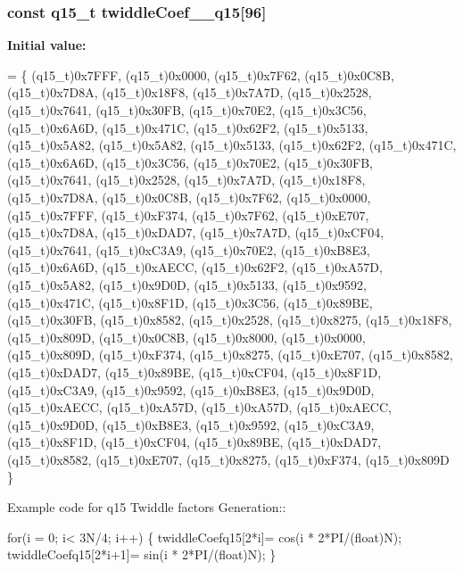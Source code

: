 \subsubsection[{\texorpdfstring{twiddle\+Coef\+\_\+64\+\_\+q15}{twiddleCoef_64_q15}}]{\setlength{\rightskip}{0pt plus 5cm}const q15\+\_\+t twiddle\+Coef\+\_\+\_\+q15\mbox{[}96\mbox{]}}\hypertarget{group__CFFT__CIFFT_gaa0cc411e0b3c82078e85cfdf1b84290f}{}\label{group__CFFT__CIFFT_gaa0cc411e0b3c82078e85cfdf1b84290f}
{\bfseries Initial value\+:}
\begin{DoxyCode}
= \{
    (q15\_t)0x7FFF, (q15\_t)0x0000, (q15\_t)0x7F62, (q15\_t)0x0C8B,
    (q15\_t)0x7D8A, (q15\_t)0x18F8, (q15\_t)0x7A7D, (q15\_t)0x2528,
    (q15\_t)0x7641, (q15\_t)0x30FB, (q15\_t)0x70E2, (q15\_t)0x3C56,
    (q15\_t)0x6A6D, (q15\_t)0x471C, (q15\_t)0x62F2, (q15\_t)0x5133,
    (q15\_t)0x5A82, (q15\_t)0x5A82, (q15\_t)0x5133, (q15\_t)0x62F2,
    (q15\_t)0x471C, (q15\_t)0x6A6D, (q15\_t)0x3C56, (q15\_t)0x70E2,
    (q15\_t)0x30FB, (q15\_t)0x7641, (q15\_t)0x2528, (q15\_t)0x7A7D,
    (q15\_t)0x18F8, (q15\_t)0x7D8A, (q15\_t)0x0C8B, (q15\_t)0x7F62,
    (q15\_t)0x0000, (q15\_t)0x7FFF, (q15\_t)0xF374, (q15\_t)0x7F62,
    (q15\_t)0xE707, (q15\_t)0x7D8A, (q15\_t)0xDAD7, (q15\_t)0x7A7D,
    (q15\_t)0xCF04, (q15\_t)0x7641, (q15\_t)0xC3A9, (q15\_t)0x70E2,
    (q15\_t)0xB8E3, (q15\_t)0x6A6D, (q15\_t)0xAECC, (q15\_t)0x62F2,
    (q15\_t)0xA57D, (q15\_t)0x5A82, (q15\_t)0x9D0D, (q15\_t)0x5133,
    (q15\_t)0x9592, (q15\_t)0x471C, (q15\_t)0x8F1D, (q15\_t)0x3C56,
    (q15\_t)0x89BE, (q15\_t)0x30FB, (q15\_t)0x8582, (q15\_t)0x2528,
    (q15\_t)0x8275, (q15\_t)0x18F8, (q15\_t)0x809D, (q15\_t)0x0C8B,
    (q15\_t)0x8000, (q15\_t)0x0000, (q15\_t)0x809D, (q15\_t)0xF374,
    (q15\_t)0x8275, (q15\_t)0xE707, (q15\_t)0x8582, (q15\_t)0xDAD7,
    (q15\_t)0x89BE, (q15\_t)0xCF04, (q15\_t)0x8F1D, (q15\_t)0xC3A9,
    (q15\_t)0x9592, (q15\_t)0xB8E3, (q15\_t)0x9D0D, (q15\_t)0xAECC,
    (q15\_t)0xA57D, (q15\_t)0xA57D, (q15\_t)0xAECC, (q15\_t)0x9D0D,
    (q15\_t)0xB8E3, (q15\_t)0x9592, (q15\_t)0xC3A9, (q15\_t)0x8F1D,
    (q15\_t)0xCF04, (q15\_t)0x89BE, (q15\_t)0xDAD7, (q15\_t)0x8582,
    (q15\_t)0xE707, (q15\_t)0x8275, (q15\_t)0xF374, (q15\_t)0x809D
\}
\end{DoxyCode}
\begin{DoxyParagraph}{}
Example code for q15 Twiddle factors Generation\+:\+: 
\end{DoxyParagraph}
\begin{DoxyParagraph}{}

\begin{DoxyPre}for(i = 0; i< 3N/4; i++)
\{
   twiddleCoefq15[2*i]= cos(i * 2*PI/(float)N);
   twiddleCoefq15[2*i+1]= sin(i * 2*PI/(float)N);
\} \end{DoxyPre}
 
\end{DoxyParagraph}
